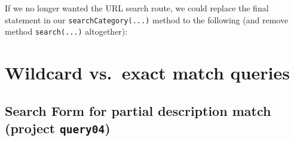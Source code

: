\documentclass[a4paperpaper,openright]{book}
\newenvironment{Shaded}{}{}
\newcommand{\CommentTok}[1]{\textcolor[rgb]{0.38,0.63,0.69}{\textit{#1}}}
\newcommand{\KeywordTok}[1]{\textcolor[rgb]{0.00,0.44,0.13}{\textbf{#1}}}
\newcommand{\NormalTok}[1]{#1}
\newcommand{\OtherTok}[1]{\textcolor[rgb]{0.00,0.44,0.13}{#1}}
\newcommand{\StringTok}[1]{\textcolor[rgb]{0.25,0.44,0.63}{#1}}
\begin{document}
If we no longer wanted the URL search route, we could replace the final
statement in our \texttt{searchCategory(...)} method to the following
(and remove method \texttt{search(...)} altogether):

\begin{Shaded}
\end{Shaded}

\hypertarget{wildcard-vs.-exact-match-queries}{%
\chapter{Wildcard vs.~exact match
queries}\label{wildcard-vs.-exact-match-queries}}

\hypertarget{search-form-for-partial-description-match-project-query04}{%
\section{\texorpdfstring{Search Form for partial description match
(project
\texttt{query04})}{Search Form for partial description match (project query04)}}\label{search-form-for-partial-description-match-project-query04}}
\end{document}
